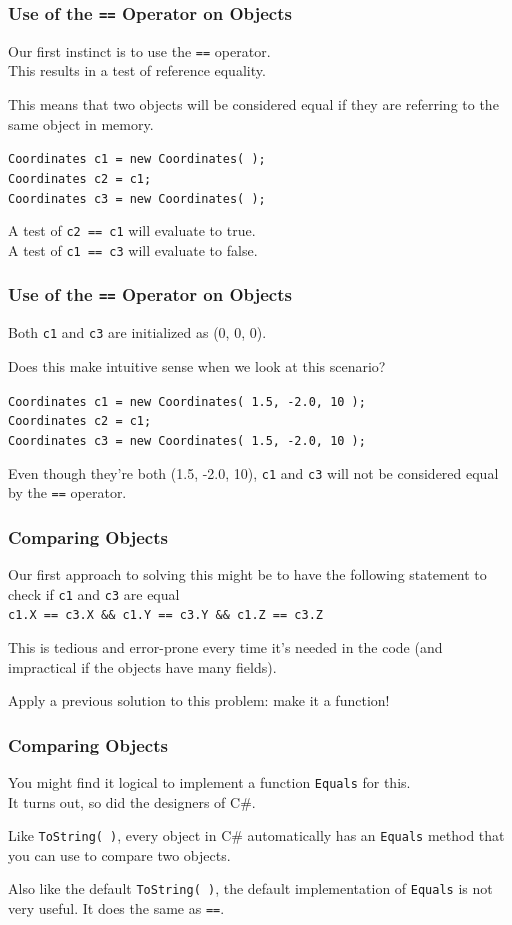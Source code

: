 \begin{frame}
\frametitle{Use of the \texttt{==} Operator on Objects}
Our first instinct is to use the \texttt{==} operator.\\
\quad This results in a test of \alert{reference equality}.

This means that two objects will be considered equal if they are referring to the same object in memory.

\texttt{Coordinates c1 = new Coordinates( );}\\
\texttt{Coordinates c2 = c1; }\\
\texttt{Coordinates c3 = new Coordinates( );}

A test of \texttt{c2 == c1} will evaluate to true.\\
A test of \texttt{c1 == c3} will evaluate to false.

\end{frame}

\begin{frame}
\frametitle{Use of the \texttt{==} Operator on Objects}
Both \texttt{c1} and \texttt{c3} are initialized as (0, 0, 0).

Does this make intuitive sense when we look at this scenario?

\texttt{Coordinates c1 = new Coordinates( 1.5, -2.0, 10 );}\\
\texttt{Coordinates c2 = c1; }\\
\texttt{Coordinates c3 = new Coordinates( 1.5, -2.0, 10 );}

Even though they're both (1.5, -2.0, 10), \texttt{c1} and \texttt{c3} will not be considered equal by the \texttt{==} operator.

\end{frame}

\begin{frame}
\frametitle{Comparing Objects}
Our first approach to solving this might be to have the following statement to check if \texttt{c1} and \texttt{c3} are equal\\
\quad \texttt{c1.X == c3.X \&\& c1.Y == c3.Y \&\& c1.Z == c3.Z}

This is tedious and error-prone every time it's needed in the code (and impractical if the objects have many fields).

Apply a previous solution to this problem: make it a function!

\end{frame}

\begin{frame}
\frametitle{Comparing Objects}
You might find it logical to implement a function \texttt{Equals} for this.\\
\quad It turns out, so did the designers of C\#.

Like \texttt{ToString( )}, every object in C\# automatically has an \texttt{Equals} method that you can use to compare two objects.

Also like the default \texttt{ToString( )}, the default implementation of \texttt{Equals} is not very useful. It does the same as \texttt{==}.

\end{frame}

